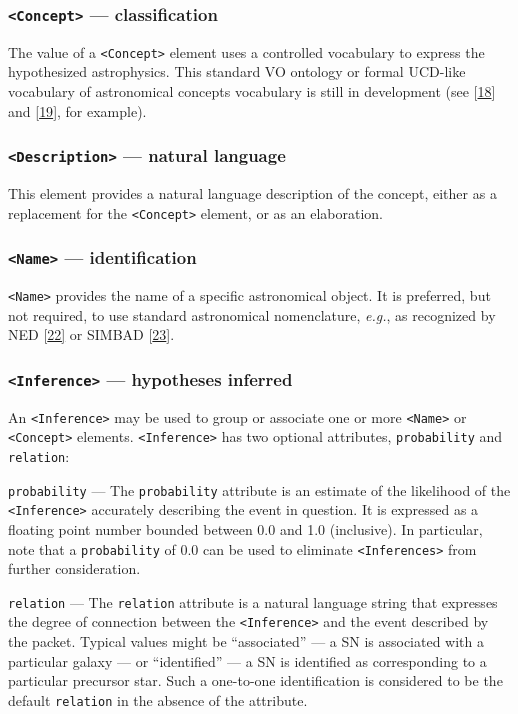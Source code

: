 \documentclass[11pt,a4paper]{ivoa}
\begin{document}
\subsubsection{{\tt <Concept>} --- classification}\label{sec:3.6.3}
The value of a {\tt <Concept>} element uses a controlled vocabulary to express the hypothesized astrophysics. This standard VO ontology or formal UCD-like vocabulary of astronomical concepts vocabulary is still in development (see [\hyperref[bib18]{18}]
and [\hyperref[bib19]{19}], for example). 

\subsubsection{{\tt <Description>} --- natural language}\label{sec:3.6.4}
This element provides a natural language description of the concept, either as a replacement for the {\tt <Concept>} element, or as an elaboration. 

\subsubsection{{\tt <Name>} --- identification}\label{sec:3.6.5}
{\tt <Name>} provides the name of a specific astronomical object. It is preferred, but not required, to use standard astronomical nomenclature, \emph{e.g.}, as recognized by NED [\hyperref[bib22]{22]} or SIMBAD [\hyperref[bib23]{23}]. 

\subsubsection{{\tt <Inference>} --- hypotheses inferred}\label{sec:3.6.6}
An {\tt <Inference>} may be used to group or associate one or more {\tt <Name>} or {\tt <Concept>} elements. {\tt <Inference>} has two optional attributes, {\tt probability} and {\tt relation}: 

 {\tt probability}\label{sec:3.6.6.1} --- The {\tt probability} attribute is an estimate of the likelihood of the {\tt <Inference>} accurately describing the event in question. It is expressed as a floating point number bounded between 0.0 and 1.0 (inclusive). In particular, note that a {\tt probability} of 0.0 can be used to eliminate {\tt <Inferences>} from further consideration. 

 {\tt relation}\label{sec:3.6.6.2} --- The {\tt relation} attribute is a natural language string that expresses the degree of connection between the {\tt <Inference>} and the event described by the packet. Typical values might be ``associated'' --- a SN is associated with a particular galaxy --- or ``identified'' --- a SN is identified as corresponding to a particular precursor star. Such a one-to-one identification is considered to be the default {\tt relation} in the absence of the attribute. 
\end{document}
